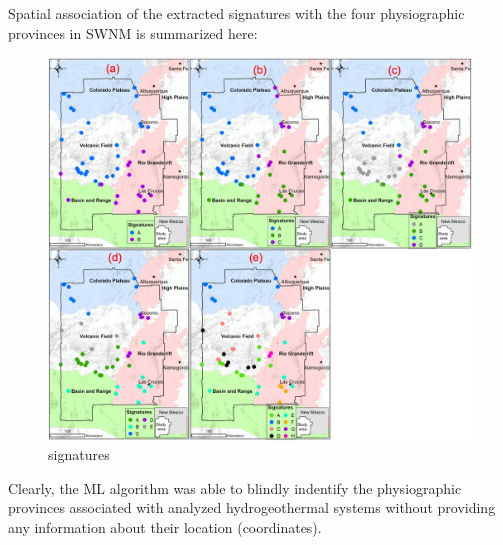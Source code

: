 \documentclass[11pt]{article}
\begin{document}
Spatial association of the extracted signatures with the four
physiographic provinces in SWNM is summarized here:

\begin{figure}
\centering
\includegraphics{../figures-case01/signatures.png}
\caption{signatures}
\end{figure}

Clearly, the ML algorithm was able to blindly indentify the
physiographic provinces associated with analyzed hydrogeothermal systems
without providing any information about their location (coordinates).


    
    
    
\end{document}
